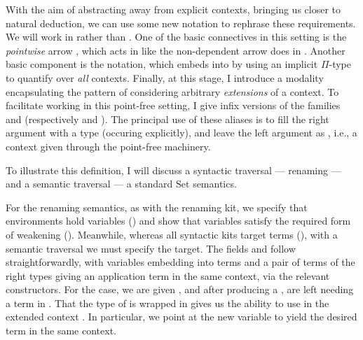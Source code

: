 With the aim of abstracting away from explicit contexts, bringing us closer to
natural deduction, we can use some new notation to rephrase these requirements.
We will work in \AgdaSpace{}\AgdaSymbol{$\to$}\AgdaSpace{}%
 rather than .
One of the basic connectives in this setting is the \emph{pointwise} arrow
\AgdaFunction{\_$\dotto$\_}, which acts in
\AgdaSpace{}\AgdaSymbol{$\to$}\AgdaSpace{}
like the non-dependent arrow does in .
Another basic component is the \AgdaFunction{$\forall[\_]$} notation, which
embeds \AgdaSpace{}\AgdaSymbol{$\to$}\AgdaSpace{}%
 into  by using an implicit $\Pi$-type
to quantify over \emph{all} contexts.
Finally, at this stage, I introduce a modality \AgdaFunction{$\bigcirc$}
encapsulating the pattern of considering arbitrary \emph{extensions} of a
context.
To facilitate working in this point-free setting, I give infix versions of
the families \AgdaBound{$\V$} and \AgdaBound{$\C$} (respectively
\AgdaFunction{\_$\V\vDash$\_} and \AgdaFunction{\_$\C\vDash$\_}).
The principal use of these aliases is to fill the right argument with a type
(occuring explicitly), and leave the left argument as \AgdaFunction{\_}, i.e.,
a context given through the point-free machinery.



To illustrate this definition, I will discuss a syntactic traversal ---
renaming --- and a semantic traversal --- a standard $\mathrm{Set}$ semantics.

For the renaming semantics, as with the renaming kit, we specify that
environments hold variables (\AgdaDatatype{\_$\ni$\_}) and show that variables
satisfy the required form of weakening ().
Meanwhile, whereas all syntactic kits target terms
(\AgdaDatatype{\_$\vdash$\_}), with a semantic traversal we must specify the
target.
The fields  and
 follow straightforwardly, with variables
embedding into terms and a pair of terms of the right types giving an
application term in the same context, via the relevant constructors.
For the  case, we are given
, and after producing a
, are left needing a term in
.
That the type of  is wrapped in \AgdaFunction{$\bigcirc$} gives
us the ability to use  in the extended context
.
In particular, we point at the new variable to yield the desired term in the
same context.

